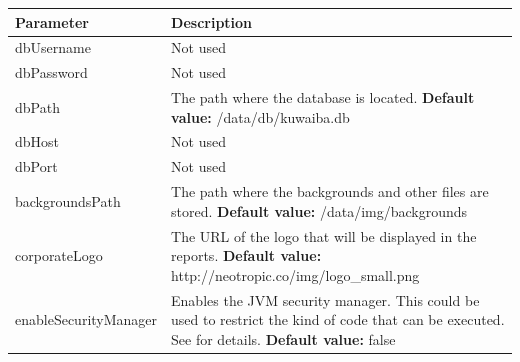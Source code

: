 \documentclass[a4paper]{article}
\begin{document}
\begin{itemize}
				\newpage
				\begin{table}[h!]
					\begin{tabular}[h!]{p{5cm}p{10cm}}
						\toprule
						\textbf{Parameter} & \textbf{Description} \\
						\midrule
						dbUsername & Not used \\
						\midrule
						dbPassword & Not used \\
						\midrule
						dbPath & The path where the database is located. \newline \textbf{Default value:} /data/db/kuwaiba.db \\ 
						\midrule
						dbHost & Not used \\
						\midrule
						dbPort & Not used \\
						\midrule
						backgroundsPath & The path where the backgrounds and other files are stored. \newline \textbf{Default value:} /data/img/backgrounds \\
						\midrule
						corporateLogo & The URL of the logo that will be displayed in the reports.  \newline \textbf{Default value:} http://neotropic.co/img/logo\_small.png\\
						\midrule
						enableSecurityManager & Enables the JVM security manager. This could be used to restrict the kind of code that can be executed. See \textbf{\nameref{app:AppendixA}} for details.  \newline \textbf{Default value:} false\\
						\bottomrule
					\end{tabular}
				\end{table}
				

\end{itemize}
\end{document}
